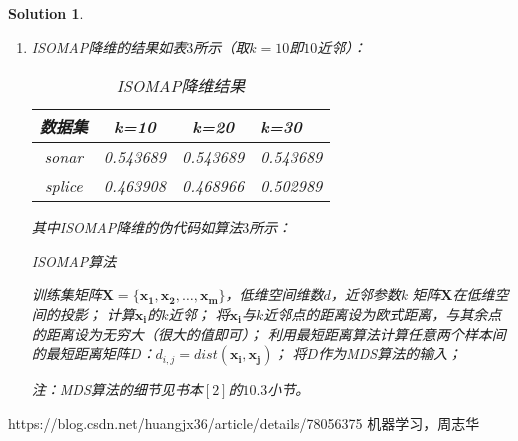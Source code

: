 \documentclass[a4paper,UTF8]{article}
\numberwithin{equation}{section}
\newtheorem*{solution}{Solution}
\begin{document}
\begin{solution}
\begin{enumerate}
	其中SVD降维的伪代码如算法$2$所示：
	\begin{algorithm}[htbp]  
        \caption{SVD算法}  
        \begin{algorithmic}[1] %
 			\Require 训练集矩阵$\mathbf{X}=\{\mathbf{x_1}, \mathbf{x_2},\dots,\mathbf{x_m}\}$，低维空间维数$d$ 
	        \Ensure 投影矩阵$\mathbf{W}$及均值向量$\bar{\mathbf{x}}$  
	        \State 求均值向量：$\bar{\mathbf{x}} \gets \frac{1}{m}\sum_{i=1}^{m}\mathbf{x_i}$；
	        \State 对所有样本进行中心化得到矩阵$\mathbf{C}$：$\mathbf{c_i} \gets \mathbf{x_i} - \bar{\mathbf{x}}$；
            \State 对矩阵$\mathbf{C}$进行奇异值分解：$\mathbf{C}=\mathbf{U}\mathbf{\sum}\mathbf{V^T}$；
            \State 令$\mathbf{W}$为$\mathbf{V^T}$的前$d$行组成的矩阵的转置；
            \State {}
        \end{algorithmic}  
    \end{algorithm} 

    对新数据降维时，只需用均值向量进行中心化后乘以投影矩阵即可。
\newpage
	\item ISOMAP降维的结果如表$3$所示（取$k=10$即$10$近邻）：
	\begin{table}[htbp]
  		\centering
  		\begin{tabular}{cccp{38mm}}
	    \toprule
	    \textbf{数据集} & \textbf{k=10} & \textbf{k=20} & \textbf{k=30} \\
	    \midrule
	    sonar  & 0.543689 & 0.543689 & 0.543689\\
	    splice & 0.463908 & 0.468966 & 0.502989\\
	    \bottomrule
  		\end{tabular}
  		\caption{ISOMAP降维结果}\label{table:1}
	\end{table}

	其中ISOMAP降维的伪代码如算法$3$所示：
	\begin{algorithm}[htbp]  
        \caption{ISOMAP算法}  
        \begin{algorithmic}[1] %
 			\Require 训练集矩阵$\mathbf{X}=\{\mathbf{x_1}, \mathbf{x_2},\dots,\mathbf{x_m}\}$，低维空间维数$d$，近邻参数k
	        \Ensure  矩阵$\mathbf{X}$在低维空间的投影；
	        	\State 计算$\mathbf{x_i}$的$k$近邻；
	        	\State 将$\mathbf{x_i}$与$k$近邻点的距离设为欧式距离，与其余点的距离设为无穷大（很大的值即可）；
	        \EndFor
	        \State 利用最短距离算法计算任意两个样本间的最短距离矩阵$D$：$d_{i,j} = dist(\mathbf{x_i}, \mathbf{x_j})$；
	        \State 将$D$作为MDS算法的输入；
            \State {}
        \end{algorithmic}  
    \end{algorithm} 

    注：MDS算法的细节见书本$[2]$的$10.3$小节。
\end{enumerate}

\end{solution}
\newpage
\begin{thebibliography}{}
 https://blog.csdn.net/huangjx36/article/details/78056375
 机器学习，周志华
\end{thebibliography}
\end{document}
